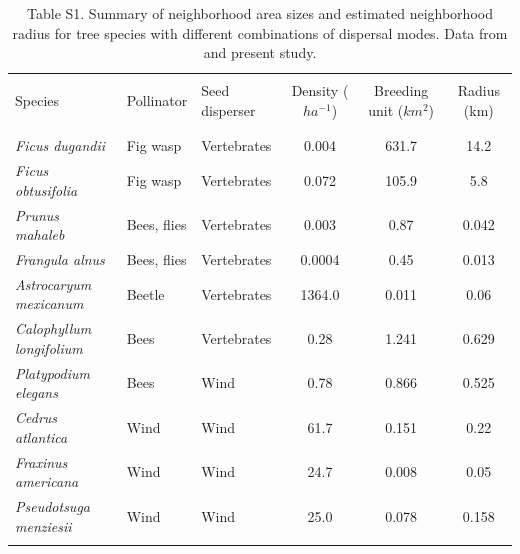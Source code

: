 \documentclass[a4paper, 12pt]{article}
\begin{document}
\begin{landscape}
\begin{table}
  \caption*{Table S1. Summary of neighborhood area sizes and estimated neighborhood radius for tree species with different combinations of dispersal modes. Data from \citet{Nason:1998aa,Garcia:2005fu,Garcia:2007he} and present study.}
  \vspace{0.5cm}
    \begin{tabular}{lllccc}
        \hline \\
     Species                & Pollinator  & Seed disperser & Density ($ha^{-1}$) & Breeding unit ($km^2$) & Radius (km) \\\\ \hline \\
    \textit{Ficus dugandii}          & Fig wasp    & Vertebrates    & 0.004          & 631.7               & 14.2        \\
    \textit{Ficus obtusifolia}       & Fig wasp    & Vertebrates    & 0.072          & 105.9               & 5.8         \\
    \textit{Prunus mahaleb}          & Bees, flies & Vertebrates    & 0.003          & 0.87                & 0.042       \\
    \textit{Frangula alnus}          & Bees, flies & Vertebrates    & 0.0004         & 0.45                & 0.013       \\
    \textit{Astrocaryum mexicanum}   & Beetle      & Vertebrates    & 1364.0         & 0.011               & 0.06        \\
    \textit{Calophyllum longifolium} & Bees        & Vertebrates    & 0.28           & 1.241               & 0.629       \\
    \textit{Platypodium elegans}     & Bees        & Wind           & 0.78           & 0.866               & 0.525       \\
    \textit{Cedrus atlantica}        & Wind        & Wind           & 61.7           & 0.151               & 0.22        \\
   \textit{Fraxinus americana}      & Wind        & Wind           & 24.7           & 0.008               & 0.05        \\
    \textit{Pseudotsuga menziesii}   & Wind        & Wind           & 25.0           & 0.078               & 0.158       \\\\
\hline
    \end{tabular}
\end{table}
\end{landscape}
\newpage 
\end{document}
